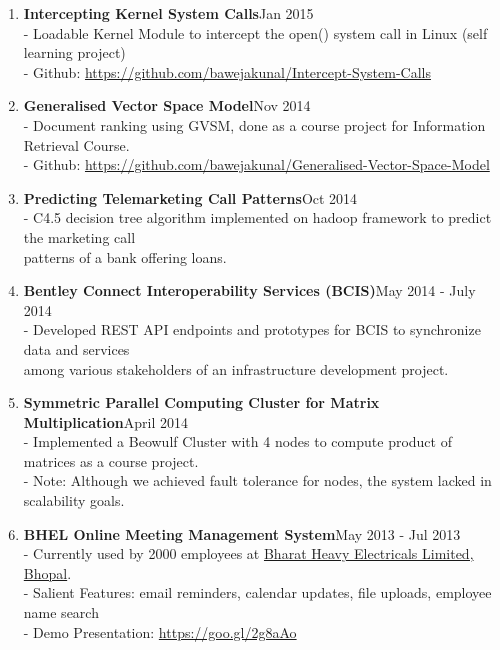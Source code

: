 \documentclass{article}
\begin{document}
\begin{enumerate}
    \item \textbf{Intercepting Kernel System Calls}{\hfill Jan 2015}\\
    - Loadable Kernel Module to intercept the open() system call in Linux (self learning project)\\
    - Github: \href{https://github.com/bawejakunal/Intercept-System-Calls}{https://github.com/bawejakunal/Intercept-System-Calls}

    \item \textbf{Generalised Vector Space Model}{\hfill Nov 2014}\\
    - Document ranking using GVSM, done as a course project for Information Retrieval Course.\\
    - Github: \href{https://github.com/bawejakunal/Generalised-Vector-Space-Model}{https://github.com/bawejakunal/Generalised-Vector-Space-Model}
    
    \item \textbf{Predicting Telemarketing Call Patterns}{\hfill Oct 2014}\\
    - C4.5 decision tree algorithm implemented on hadoop framework to predict the marketing call\\
    \hspace*{0.7em}patterns of a bank offering loans.

    \item \textbf{Bentley Connect Interoperability Services (BCIS)}{\hfill May 2014 - July 2014}\\
    - Developed REST API endpoints and prototypes for BCIS to synchronize data and services\\
    \hspace*{0.7em}among various stakeholders of an infrastructure development project.
    
    \item \textbf{Symmetric Parallel Computing Cluster for Matrix Multiplication}{\hfill April 2014}\\
    - Implemented a Beowulf Cluster with 4 nodes to compute product of matrices as a course project.\\
    - Note: Although we achieved fault tolerance for nodes, the system lacked in scalability goals.
    
    \item \textbf{BHEL Online Meeting Management System}{\hfill May 2013 - Jul 2013}\\
    - Currently used by 2000 employees at \href{https://www.bhelbpl.co.in/bplweb_new/}{Bharat Heavy Electricals Limited, Bhopal}.\\
    - Salient Features: email reminders, calendar updates, file uploads, employee name search\\
    - Demo Presentation: \href{https://goo.gl/2g8aAo}{https://goo.gl/2g8aAo}
    

\end{enumerate}
\end{document}
